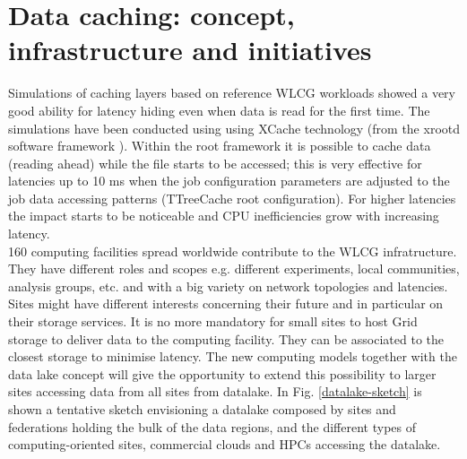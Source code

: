 \section{Data caching: concept, infrastructure and initiatives}
Simulations of caching layers based on reference WLCG workloads showed a very good ability for latency hiding 
even when data is read for the first time. The simulations have been conducted using using XCache technology 
(from the xrootd software framework \cite{xroot}).
Within the root framework \cite{root} it is possible to cache data (reading ahead) while the file starts 
to be accessed; this is very effective for latencies up to 10 ms when the job configuration parameters are adjusted 
to the job data accessing patterns (TTreeCache root configuration). For higher latencies the impact 
starts to be noticeable and CPU inefficiencies grow with increasing latency.\\
160 computing facilities spread worldwide contribute to the WLCG infratructure. They have different roles and 
scopes e.g. different experiments, local communities, analysis groups, etc. and with a big variety on network topologies and latencies. Sites might have different interests concerning their future and in particular on their storage services. It is no more
mandatory for small sites to host Grid storage to deliver data to the computing facility. They can be associated 
to the closest storage to minimise latency. The new 
computing models together with the data lake concept will give the opportunity to extend this possibility to larger sites
accessing data from all sites from datalake. 
In Fig. \ref{datalake-sketch} is shown a tentative 
sketch envisioning a datalake composed by sites and federations holding the bulk of the data regions, and 
the different types of computing-oriented sites, commercial clouds and HPCs accessing the datalake.\\

